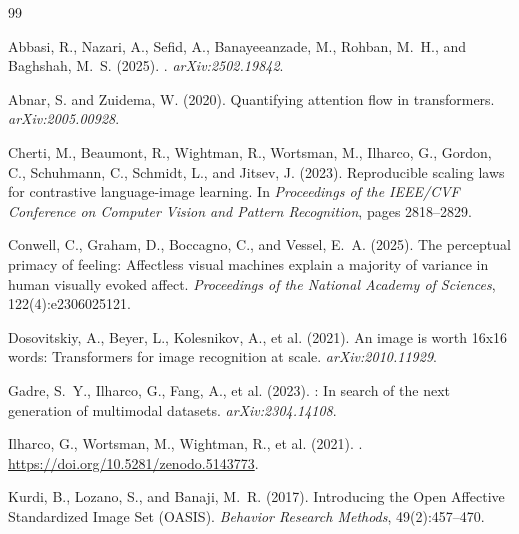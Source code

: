 \documentclass[12pt]{article}
\begin{document}
\begin{thebibliography}{99}

Abbasi, R., Nazari, A., Sefid, A., Banayeeanzade, M., Rohban, M.~H., and Baghshah, M.~S. (2025).
.
\newblock \emph{arXiv:2502.19842}.

Abnar, S. and Zuidema, W. (2020).
\newblock Quantifying attention flow in transformers.
\newblock \emph{arXiv:2005.00928}.

Cherti, M., Beaumont, R., Wightman, R., Wortsman, M., Ilharco, G., Gordon, C., Schuhmann, C., Schmidt, L., and Jitsev, J. (2023).
\newblock Reproducible scaling laws for contrastive language-image learning.
\newblock In \emph{Proceedings of the IEEE/CVF Conference on Computer Vision and Pattern Recognition}, pages 2818--2829.

Conwell, C., Graham, D., Boccagno, C., and Vessel, E.~A. (2025).
\newblock The perceptual primacy of feeling: Affectless visual machines explain a majority of variance in human visually evoked affect.
\newblock \emph{Proceedings of the National Academy of Sciences}, 122(4):e2306025121.

Dosovitskiy, A., Beyer, L., Kolesnikov, A., et al. (2021).
\newblock An image is worth 16x16 words: Transformers for image recognition at scale.
\newblock \emph{arXiv:2010.11929}.

Gadre, S.~Y., Ilharco, G., Fang, A., et al. (2023).
: In search of the next generation of multimodal datasets.
\newblock \emph{arXiv:2304.14108}.

Ilharco, G., Wortsman, M., Wightman, R., et al. (2021).
.
\newblock \url{https://doi.org/10.5281/zenodo.5143773}.

Kurdi, B., Lozano, S., and Banaji, M.~R. (2017).
\newblock Introducing the Open Affective Standardized Image Set ({OASIS}).
\newblock \emph{Behavior Research Methods}, 49(2):457--470.


\end{thebibliography}
\end{document}
